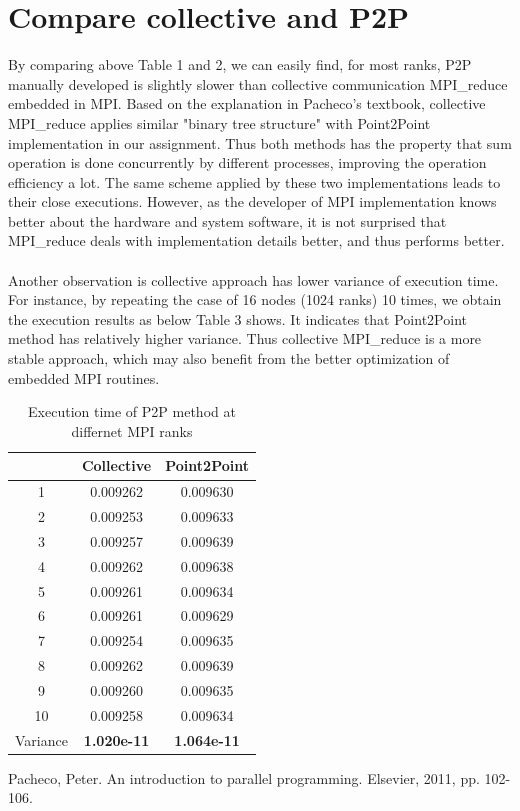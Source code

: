 \documentclass{article}
\begin{document}
\section{Compare collective and P2P}
By comparing above Table 1 and 2, we can easily find, for most ranks, P2P manually developed is slightly slower than collective communication MPI\_reduce embedded in MPI. Based on the explanation in Pacheco's textbook\cite{Pacheco}, collective  MPI\_reduce applies similar "binary tree structure" with Point2Point implementation in our assignment. Thus both methods has the property that sum operation is done concurrently by different processes, improving the operation efficiency a lot. The same scheme applied by these two implementations leads to their close executions. However, as the developer of MPI implementation knows better about the hardware and system software, it is not surprised that MPI\_reduce deals with implementation details better, and thus performs better.\\\\
Another observation is collective approach has lower variance of execution time. For instance, by repeating the case of 16 nodes (1024 ranks) 10 times, we obtain the execution results as below Table 3 shows. It indicates that Point2Point method has relatively higher variance. Thus collective MPI\_reduce is a more stable approach, which may also benefit from the better optimization of embedded MPI routines.
\begin{table}[!htb]\centering
	\begin{tabular}{|c|c|c|}
		\hline
		& Collective & Point2Point \\
		\hline
		 1 & 0.009262  &  0.009630\\
		 \hline
		 2 & 0.009253  &  0.009633\\
		 \hline
		 3 & 0.009257  &  0.009639\\
		 \hline
		 4 & 0.009262  &  0.009638\\
		 \hline
		 5 & 0.009261  &  0.009634\\
		 \hline
		 6 & 0.009261  &  0.009629\\
		 \hline
		 7 & 0.009254  &  0.009635\\
		 \hline
		 8 & 0.009262  &  0.009639\\
		 \hline
		 9 & 0.009260  &  0.009635\\
		 \hline
		 10 & 0.009258  &  0.009634\\
		\hline
		Variance & \textbf{1.020e-11}  &  \textbf{1.064e-11}\\
		\hline
	\end{tabular}
	\caption{ Execution time of P2P method at differnet MPI ranks}
\end{table}

\newpage
\begin{thebibliography}{}
	Pacheco, Peter. An introduction to parallel programming. Elsevier, 2011, pp. 102-106.
\end{thebibliography}
\end{document}
